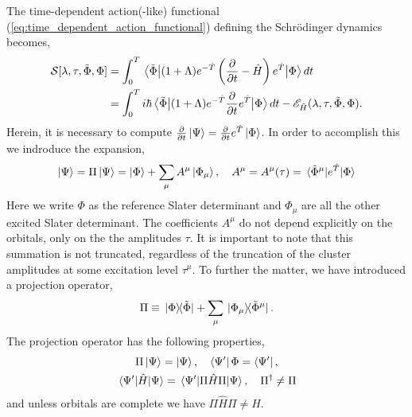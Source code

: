 The time-dependent action(-like) functional (\autoref{eq:time_dependent_action_functional}) 
defining the Schrödinger dynamics becomes,
\begin{equation}
    \begin{aligned}
        \label{eq:oatdcc_functional}
        \mathcal{S}[\lambda, \tau, \tilde{\Phi}, \Phi]
        &= \int_0^T \mel{\tilde{\Phi}}
            {(1 + \Lambda)e^{-\hat{T}}\left(\frac{\partial}{\partial t} - \hat{H} \right)e^{\hat{T}}} 
            {\Phi} dt \\ 
        &= \int_0^T i\hbar\mel{\tilde{\Phi}}
        {(1 + \Lambda)e^{-\hat{T}}\frac{\partial}{\partial t}e^{\hat{T}}}
        {\Phi} dt
        - \mathscr{E}_{\hat{H}}(\lambda, \tau, \tilde{\Phi}, \Phi).
    \end{aligned} 
\end{equation}
Herein, it is necessary to compute 
$\frac{\partial}{\partial t}\ket{\Psi} = \frac{\partial}{\partial t}e^{\hat{T}}\ket{\Phi}$.
In order to accomplish this we indroduce the expansion,
\begin{equation}
    \ket{\Psi} = \Pi\ket{\Psi} = \ket{\Phi} + \sum_\mu A^\mu \ket{\Phi_\mu}, \quad
    A^\mu = A^\mu(\tau) = \mel*{\tilde{\Phi}^\mu}{e^{\hat{T}}}{\Phi}
\end{equation}
Here we write $\Phi$ as the reference Slater determinant and $\Phi_\mu$ are all the other 
excited Slater determinant. The coefficients $A^\mu$ do not depend explicitly on the 
orbitals, only on the the amplitudes $\tau$. It is important to note that this summation is not truncated,
regardless of the truncation of the cluster amplitudes at some excitation level $\tau^\mu$.
To further the matter, we have introduced a projection operator,
\begin{equation}
    \Pi \equiv \outerproduct*{\Phi}{\tilde{\Phi}} 
    + \sum_\mu \outerproduct*{\Phi_\mu}{\tilde{\Phi}^\mu}.
\end{equation}
The projection operator has the following properties,
\begin{equation}
    \begin{gathered}
        \Pi \ket{\Psi} = \ket{\Psi}, \quad \bra{\Psi'}\Phi = \bra{\Psi'}, \\
        \mel{\Psi'}{\hat{H}}{\Psi} = \mel{\Psi'}{\Pi\hat{H}\Pi}{\Psi},
        \quad \Pi^\dagger \neq \Pi
    \end{gathered}
\end{equation}
and unless orbitals are complete we have $\Pi\hat{H}\Pi \neq \hat{H}$.

